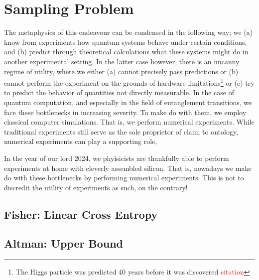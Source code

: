 \section{Sampling Problem}\label{sec:sampling}
The metaphysics of this endeavour can
be condensed in the following way; we (a) know from experiments how quantum
systems behave under certain conditions, and (b) predict through theoretical
calculations what these systems might do in another experimental setting. In
the latter case however, there is an uncanny regime of utility, where we either
(a) cannot precisely pass predictions or (b) cannot perform the experiment on
the grounds of hardware limitations\footnote{The Higgs particle was predicted
40 years before it was discovered \textcolor{red}{citation}} or (c) try to
predict the behavior of quantities not directly measurable. In the case of
quantum computation, and especially in the field of entanglement transitions,
we face these bottlenecks in increasing severity. To make do with them, we
employ classical computer simulations. That is, we perform numerical
experiments. While traditional experiments still serve as the sole proprietor of claim to
ontology, numerical experiments can play a supporting role, 

In the year of our
lord 2024, we phyisicists are thankfully able to perform experiments at home
with cleverly assembled silicon.  That is, nowadays we make do with these
bottlenecks by performing numerical experiments. This is not to discredit the
utility of experiments as such, on the contrary! 

\subsection{Fisher: Linear Cross Entropy}
\cite{liCrossEntropyBenchmark2023}

\subsection{Altman: Upper Bound}
\cite{garrattProbingPostmeasurementEntanglement2024}
